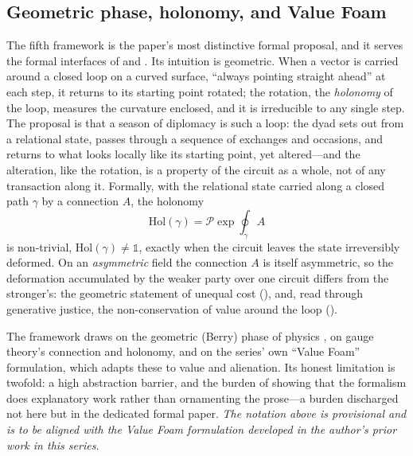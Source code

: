 \subsection{Geometric phase, holonomy, and Value Foam}
The fifth framework is the paper's most distinctive formal proposal, and it serves the formal interfaces of  and . Its intuition is geometric. When a vector is carried around a closed loop on a curved surface, ``always pointing straight ahead'' at each step, it returns to its starting point rotated; the rotation, the \emph{holonomy} of the loop, measures the curvature enclosed, and it is irreducible to any single step. The proposal is that a season of diplomacy is such a loop: the dyad sets out from a relational state, passes through a sequence of exchanges and occasions, and returns to what looks locally like its starting point, yet altered---and the alteration, like the rotation, is a property of the circuit as a whole, not of any transaction along it. Formally, with the relational state carried along a closed path $\gamma$ by a connection $A$, the holonomy
\[
  \mathrm{Hol}(\gamma)=\mathcal{P}\exp\!\oint_{\gamma} A
\]
is non-trivial, $\mathrm{Hol}(\gamma)\neq\mathbb{1}$, exactly when the circuit leaves the state irreversibly deformed. On an \emph{asymmetric} field the connection $A$ is itself asymmetric, so the deformation accumulated by the weaker party over one circuit differs from the stronger's: the geometric statement of unequal cost (), and, read through generative justice, the non-conservation of value around the loop ().

The framework draws on the geometric (Berry) phase of physics \parencite{berry1984,simon1983}, on gauge theory's connection and holonomy, and on the series' own ``Value Foam'' formulation, which adapts these to value and alienation. Its honest limitation is twofold: a high abstraction barrier, and the burden of showing that the formalism does explanatory work rather than ornamenting the prose---a burden discharged not here but in the dedicated formal paper. \emph{The notation above is provisional and is to be aligned with the Value Foam formulation developed in the author's prior work in this series.}

